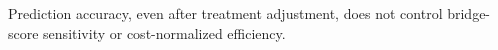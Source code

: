 Prediction accuracy, even after treatment adjustment, does not control bridge-score sensitivity or cost-normalized efficiency.
